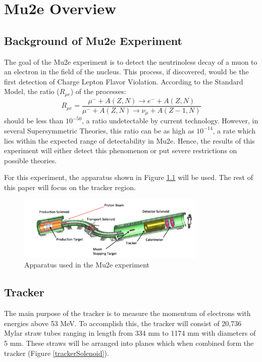 %
%
\chapter{Mu2e Overview}\label{ch:overview}

\section{Background of Mu2e Experiment}
The goal of the Mu2e experiment is to detect the neutrinoless decay of a muon to an electron in the field of the nucleus. This process, if discovered, would be the first detection of Charge Lepton Flavor Violation. According to the Standard Model, the ratio ($R_{\mu e}$) of the processes:
\begin{equation}
  R_{\mu e} =  \frac{\mu^{-} + A (Z , N) \rightarrow e^{-} + A (Z,N)}{\mu^{-} + A(Z,N) \rightarrow \nu_{\mu}  + A(Z-1,N)}
\end{equation}
should be less than $10^{-50}$, a ratio undetectable by current technology. However, in several Supersymmetric Theories, this ratio can be as high as $10^{-14}$, a rate which lies within the expected range of detectability in Mu2e. Hence, the results of this experiment will either detect this phenomenon or put severe restrictions on possible theories.

For this experiment, the apparatus shown in Figure \ref{Mu2eApparatus} will be used. The rest of this paper will focus on the tracker region. 


\begin{figure}[htp!]
    \centering
    \includegraphics[width=0.8\textwidth]{Images/Mu2eDetector.png}
    \caption{Apparatus used in the Mu2e experiment}
    \label{Mu2eApparatus}
\end{figure} 

\section{Tracker}
The main purpose of the tracker is to measure the momentum of electrons with energies above 53 MeV. To accomplish this, the tracker will consist of 20,736 Mylar straw tubes ranging in length from 334 mm to 1174 mm with diameters of 5 mm. These straws will be arranged into planes which when combined form the tracker (Figure \ref{trackerSolenoid}).

